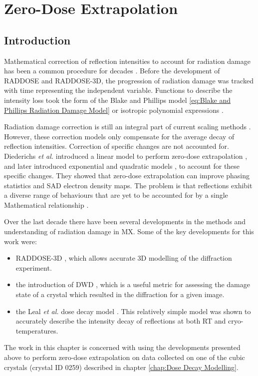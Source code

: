 \chapter{Zero-Dose Extrapolation}
\label{chap:Zero-Dose Extrapolation}

\section{Introduction}
\label{sec:Introduction - Zero-Dose extrapolation}
Mathematical correction of reflection intensities to account for radiation damage has been a common procedure for decades \cite{hendrickson1973,abrahams1987anisotropy}.
Before the development of RADDOSE and RADDOSE-3D, the progression of radiation damage was tracked with time representing the independent variable.
Functions to describe the intensity loss took the form of the Blake and Phillips model \ref{eq:Blake and Phillips Radiation Damage Model} or isotropic polynomial expressions \cite{abrahams1987anisotropy}.

Radiation damage correction is still an integral part of current scaling methods \cite{otwinowski2003multiparametric,evans2005,kabsch2010integration}.
However, these correction models only compensate for the average decay of reflection intensities.
Correction of specific changes are not accounted for.
Diederichs \textit{et al.}  introduced a linear model to perform zero-dose extrapolation \cite{diederichs2003}, and later introduced exponential and quadratic models \cite{diederichs2006}, to account for these specific changes.
They showed that zero-dose extrapolation can improve phasing statistics and SAD electron density maps.
The problem is that reflections exhibit a diverse range of behaviours that are yet to be accounted for by a single Mathematical relationship \cite{blake1962,abrahams1973}.

Over the last decade there have been several developments in the methods and understanding of radiation damage in MX.
Some of the key developments for this work were:
\begin{itemize}
    \item RADDOSE-3D \cite{zeldin2013}, which allows accurate 3D modelling of the diffraction experiment.
    \item the introduction of DWD \cite{zeldin2013dwd}, which is a useful metric for assessing the damage state of a crystal which resulted in the diffraction for a given image.
    \item the Leal \textit{et al.} dose decay model \cite{leal2012}. This relatively simple model was shown to accurately describe the intensity decay of reflections at both RT and cryo-temperatures.
\end{itemize}
The work in this chapter is concerned with using the developments presented above to perform zero-dose extrapolation on data collected on one of the cubic crystals (crystal ID 0259) described in chapter \ref{chap:Dose Decay Modelling}.
